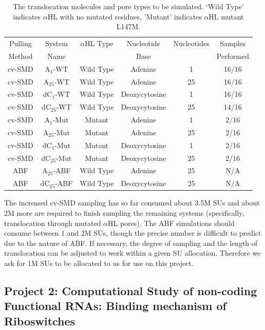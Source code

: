 \documentclass[a4paper,10pt]{article}
\newcommand{\dctfnsp}{dC$_{25}$}
\newcommand{\atfnsp}{A$_{25}$}
\newcommand{\dconsp}{dC$_{1}$}
\newcommand{\aonsp}{A$_{1}$}
\newcommand{\ahl}{$\alpha$HL }
\begin{document}
\begin{table}[!h]
\begin{center}
  \caption{The translocation molecules and pore types
to be simulated. `Wild Type' indicates \ahl with no mutated residues,
'Mutant' indicates \ahl mutant L147M.\newline}
\label{table:systems}
\begin{tabular}{| c | c | c | c | c | c |}
\hline
Pulling & System & \ahl Type & Nucleotide & Nucleotides & Samples \\
Method & Name &  & Base &  & Performed \\
\hline
cv-SMD & \aonsp-WT & Wild Type & Adenine & 1 & 16/16 \\
cv-SMD & \atfnsp-WT & Wild Type & Adenine & 25 & 16/16 \\
cv-SMD & \dconsp-WT & Wild Type & Deoxycytosine & 1 & 16/16 \\
cv-SMD & \dctfnsp-WT & Wild Type & Deoxycytosine & 25 & 14/16 \\
cv-SMD & \aonsp-Mut & Mutant & Adenine & 1 & 2/16 \\
cv-SMD & \atfnsp-Mut & Mutant & Adenine & 25 & 2/16 \\
cv-SMD & \dconsp-Mut & Mutant & Deoxycytosine & 1 & 2/16 \\
cv-SMD & \dctfnsp-Mut & Mutant & Deoxycytosine & 25 & 2/16 \\
ABF & \atfnsp-ABF & Wild Type & Adenine & 25 & N/A \\
ABF & \dctfnsp-ABF & Wild Type & Deoxycytosine & 25 & N/A \\
\hline
\end{tabular}
\end{center}
\end{table}

The increased cv-SMD sampling has so far consumed about 3.5M SUs and
about 2M more are required to finish sampling the remaining systems
(specifically, translocation through mutated \ahl pores). The ABF
simulations should consume between 1 and 2M SUs, though the precise
number is difficult to predict due to the nature of ABF. If necessary,
the degree of sampling and the length of translocation can be adjusted
to work within a given SU allocation. Therefore we ask for 1M SUs to
be allocated to us for use on this project.


\subsection*{Project 2: Computational Study of non-coding Functional RNAs: Binding mechanism of Riboswitches}
\end{document}
